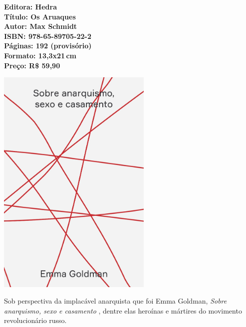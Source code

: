 \vfill

\noindent\begin{minipage}[c]{1\linewidth}
{\small\textbf{
\hspace*{-.1cm}Editora: Hedra\\
Título: Os Aruaques\\
Autor: Max Schmidt\\ 
ISBN: 978-65-89705-22-2\\
Páginas: 192 (provisório)\\
Formato: 13,3x21\,cm\\
Preço: R\$ 59,90\\
}}
\end{minipage}

\pagebreak

\begin{center}
\hspace*{.5cm}\includegraphics[width=74mm]{./CAPAS/goldman.jpg}
\end{center}

\hspace*{-7cm}\hrulefill\hspace*{-7cm}

\medskip

\noindent{}Sob perspectiva da implacável anarquista que foi Emma Goldman, \textit{Sobre anarquismo, sexo e casamento} , dentre elas heroínas e mártires do movimento revolucionário russo. 


